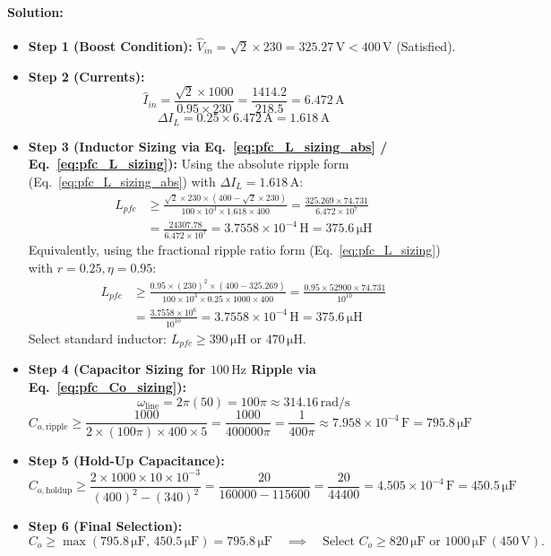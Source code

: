 \paragraph{Solution:}
\begin{itemize}
  \item \textbf{Step 1 (Boost Condition):} $\hat{V}_{in} = \sqrt{2} \times 230 = 325.27\,\si{\volt} < 400\,\si{\volt}$ (Satisfied).
  \item \textbf{Step 2 (Currents):}
  \[
  \hat{I}_{in} = \frac{\sqrt{2} \times 1000}{0.95 \times 230} = \frac{1414.2}{218.5} = 6.472\,\si{\ampere}
  \]
  \[
  \Delta I_L = 0.25 \times 6.472\,\si{\ampere} = 1.618\,\si{\ampere}
  \]
  \item \textbf{Step 3 (Inductor Sizing via Eq.~\ref{eq:pfc_L_sizing_abs} / Eq.~\ref{eq:pfc_L_sizing}):}
  Using the absolute ripple form (Eq.~\ref{eq:pfc_L_sizing_abs}) with $\Delta I_L = 1.618\,\si{\ampere}$:
  \begin{align*}
  L_{pfc} &\ge \frac{\sqrt{2} \times 230 \times (400 - \sqrt{2} \times 230)}{100\times 10^3 \times 1.618 \times 400} = \frac{325.269 \times 74.731}{6.472 \times 10^7} \\
  &= \frac{24307.78}{6.472 \times 10^7} = 3.7558 \times 10^{-4}\,\si{\henry} = 375.6\,\si{\micro\henry}
  \end{align*}
  Equivalently, using the fractional ripple ratio form (Eq.~\ref{eq:pfc_L_sizing}) with $r = 0.25, \eta = 0.95$:
  \begin{align*}
  L_{pfc} &\ge \frac{0.95 \times (230)^2 \times (400 - 325.269)}{100\times 10^3 \times 0.25 \times 1000 \times 400} = \frac{0.95 \times 52900 \times 74.731}{10^{10}} \\
  &= \frac{3.7558 \times 10^6}{10^{10}} = 3.7558 \times 10^{-4}\,\si{\henry} = 375.6\,\si{\micro\henry}
  \end{align*}
  Select standard inductor: $L_{pfc} \ge 390\,\si{\micro\henry}$ or $470\,\si{\micro\henry}$.
  \item \textbf{Step 4 (Capacitor Sizing for $100\,\si{\hertz}$ Ripple via Eq.~\ref{eq:pfc_Co_sizing}):}
  \[
  \omega_{\mathrm{line}} = 2\pi (50) = 100\pi \approx 314.16\,\si{\radian\per\second}
  \]
  \[
  C_{o,\mathrm{ripple}} \ge \frac{1000}{2 \times (100\pi) \times 400 \times 5} = \frac{1000}{400000\pi} = \frac{1}{400\pi} \approx 7.958 \times 10^{-4}\,\si{\farad} = 795.8\,\si{\micro\farad}
  \]
  \item \textbf{Step 5 (Hold-Up Capacitance):}
  \[
  C_{o,\mathrm{holdup}} \ge \frac{2 \times 1000 \times 10 \times 10^{-3}}{(400)^2 - (340)^2} = \frac{20}{160000 - 115600} = \frac{20}{44400} = 4.505 \times 10^{-4}\,\si{\farad} = 450.5\,\si{\micro\farad}
  \]
  \item \textbf{Step 6 (Final Selection):}
  \[
  C_o \ge \max(795.8\,\si{\micro\farad},\, 450.5\,\si{\micro\farad}) = 795.8\,\si{\micro\farad} \quad \implies \quad \text{Select } C_o \ge 820\,\si{\micro\farad} \text{ or } 1000\,\si{\micro\farad} \, (450\,\si{\volt}).
  \]
\end{itemize}

